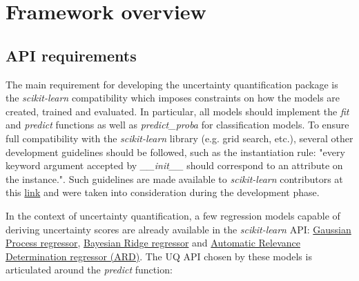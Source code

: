

\section{Framework overview}

\subsection{API requirements} \label{implementation:api-requirements}

The main requirement for developing the uncertainty quantification package is the \textit{scikit-learn} compatibility which imposes constraints on how the models are created, trained and evaluated. In particular, all models should implement the \textit{fit} and \textit{predict} functions as well as \textit{predict\_proba} for classification models. To ensure full compatibility with the \textit{scikit-learn} library (e.g. grid search, etc.), several other development guidelines should be followed, such as the instantiation rule: "every keyword argument accepted by \textit{\_\_init\_\_} should correspond to an attribute on the instance.". Such guidelines are made available to \textit{scikit-learn} contributors at this \href{https://scikit-learn.org/dev/developers/develop.html}{link} and were taken into consideration during the development phase. 

In the context of uncertainty quantification, a few regression models capable of deriving uncertainty scores are already available in the \textit{scikit-learn} API: \href{https://scikit-learn.org/stable/modules/generated/sklearn.gaussian_process.GaussianProcessRegressor.html#sklearn.gaussian_process.GaussianProcessRegressor}{Gaussian Process regressor}, \href{https://scikit-learn.org/stable/modules/generated/sklearn.linear_model.BayesianRidge.html#sklearn.linear_model.BayesianRidge}{Bayesian Ridge regressor} and \href{https://scikit-learn.org/stable/modules/generated/sklearn.linear_model.ARDRegression.html#sklearn.linear_model.ARDRegression}{Automatic Relevance Determination regressor (ARD)}. The UQ API chosen by these models is articulated around the \textit{predict} function:


